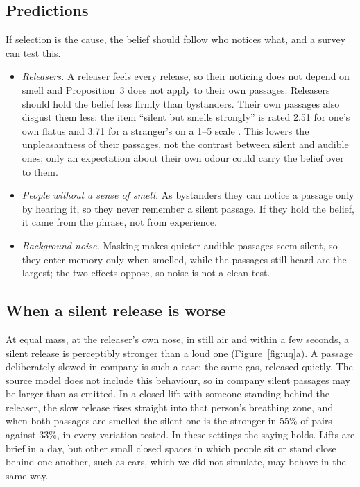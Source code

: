 \subsection{Predictions}
\label{sec:predictions}
If selection is the cause, the belief should follow who notices what, and a survey can test this.
\begin{itemize}
  \item \emph{Releasers.} A releaser feels every release, so their noticing does not depend on smell and Proposition~3
  does not apply to their own passages. Releasers should hold the belief less firmly than bystanders. Their own
  passages also disgust them less: the item ``silent but smells strongly'' is rated 2.51 for one's own flatus and
  3.71 for a stranger's on a 1--5 scale \cite{liuzza2016}. This lowers the unpleasantness of their passages, not the
  contrast between silent and audible ones; only an expectation about their own odour \cite{hold1977} could carry
  the belief over to them.
  \item \emph{People without a sense of smell.} As bystanders they can notice a passage only by hearing it, so they
  never remember a silent passage. If they hold the belief, it came from the phrase, not from experience.
  \item \emph{Background noise.} Masking makes quieter audible passages seem silent, so they enter memory only when
  smelled, while the passages still heard are the largest; the two effects oppose, so noise is not a clean test.
\end{itemize}

\subsection{When a silent release is worse}
At equal mass, at the releaser's own nose, in still air and within a few seconds, a silent release is perceptibly
stronger than a loud one (Figure~\ref{fig:uq}a). A passage deliberately slowed in company is such a case: the same
gas, released quietly. The source model does not include this behaviour, so in company silent passages may be larger
than as emitted. In a closed lift with someone standing behind the releaser, the slow
release rises straight into that person's breathing zone, and when both passages are smelled the silent one is the
stronger in 55\% of pairs against 33\%, in every variation tested. In these settings the saying holds. Lifts are
brief in a day, but other small closed spaces in which people sit or stand close behind one another, such as cars,
which we did not simulate, may behave in the same way.

